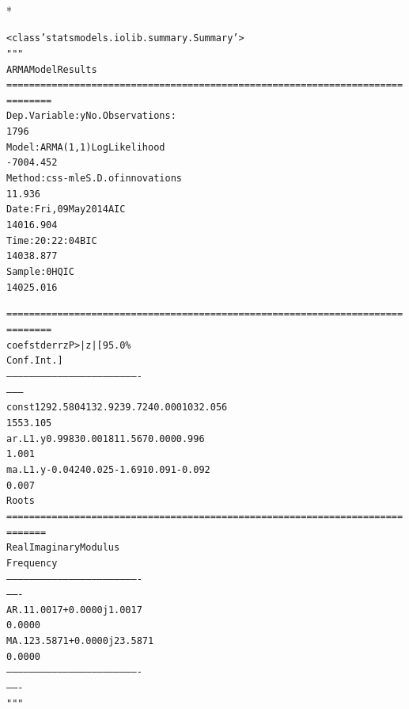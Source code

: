 \documentclass[letterpaper,10pt,english]{/Users/edwsurewin/anaconda/lib/python2.7/site-packages/sphinx/texinputs/sphinxhowto}
\def\smaller{\fontsize{9.5pt}{9.5pt}\selectfont}
\newenvironment{InvisibleVerbatim}
        {\begin{mdframed}[leftmargin=0.1\linewidth,innerleftmargin=3pt,innerrightmargin=3pt, userdefinedwidth=1\linewidth, linewidth=0pt, linecolor=white, usetwoside=false]}
        {\end{mdframed}}
\begin{document}
\fi
    

        
        

            
                \makebox[0.1\linewidth]{\smaller\hfill\tt\color{nbframe-out-prompt}Out\hspace{4pt}{[}6{]}:\hspace{4pt}}\\*
                \vspace{-2.55\baselineskip}\begin{InvisibleVerbatim}
                \vspace{-0.5\baselineskip}
\begin{alltt}<class 'statsmodels.iolib.summary.Summary'>
"""
                              ARMA Model Results
======================================================================
========
Dep. Variable:                      y   No. Observations:
1796
Model:                     ARMA(1, 1)   Log Likelihood
-7004.452
Method:                       css-mle   S.D. of innovations
11.936
Date:                Fri, 09 May 2014   AIC
14016.904
Time:                        20:22:04   BIC
14038.877
Sample:                             0   HQIC
14025.016

======================================================================
========
                 coef    std err          z      P>|z|      [95.0\%
Conf. Int.]
----------------------------------------------------------------------
--------
const       1292.5804    132.923      9.724      0.000      1032.056
1553.105
ar.L1.y        0.9983      0.001    811.567      0.000         0.996
1.001
ma.L1.y       -0.0424      0.025     -1.691      0.091        -0.092
0.007
                                    Roots
======================================================================
=======
                 Real           Imaginary           Modulus
Frequency
----------------------------------------------------------------------
-------
AR.1            1.0017           +0.0000j            1.0017
0.0000
MA.1           23.5871           +0.0000j           23.5871
0.0000
----------------------------------------------------------------------
-------
"""\end{alltt}

            \end{InvisibleVerbatim}
            
\end{document}
